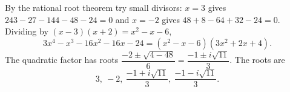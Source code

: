By the rational root theorem try small divisors: $x=3$ gives $243-27-144-48-24=0$ and $x=-2$ gives $48+8-64+32-24=0$. Dividing by $(x-3)(x+2)=x^2-x-6$,
\[3x^4-x^3-16x^2-16x-24=\left(x^2-x-6\right)\left(3x^2+2x+4\right).\]
The quadratic factor has roots $\dfrac{-2\pm\sqrt{4-48}}{6}=\dfrac{-1\pm i\sqrt{11}}{3}$. The roots are
\[\boxed{3,\ -2,\ \dfrac{-1+i\sqrt{11}}{3},\ \dfrac{-1-i\sqrt{11}}{3}}.\]
